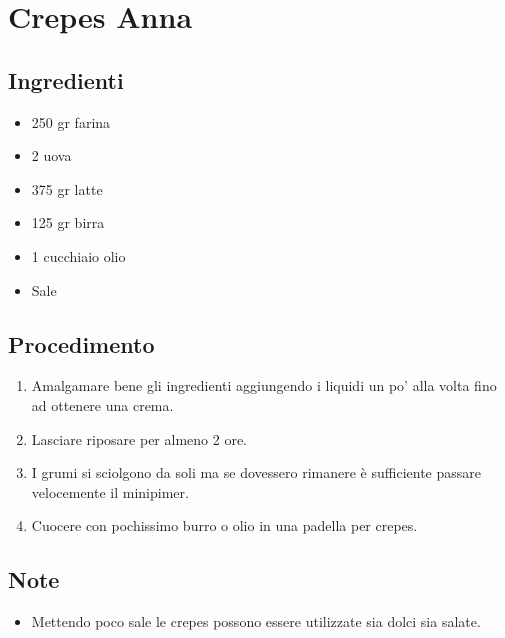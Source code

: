 \section{Crepes Anna}
\subsection{Ingredienti}
\begin{itemize}
\item 250 gr farina  
\item 2 uova  
\item 375 gr latte  
\item 125 gr birra  
\item 1 cucchiaio olio  
\item Sale
\end{itemize}
\subsection{Procedimento}
\begin{enumerate}
\item  Amalgamare bene gli ingredienti aggiungendo i liquidi un po' alla volta fino ad ottenere una crema.  
\item  Lasciare riposare per almeno 2 ore.  
\item  I grumi si sciolgono da soli ma se dovessero rimanere è sufficiente passare velocemente il minipimer.  
\item  Cuocere con pochissimo burro o olio in una padella per crepes.
\end{enumerate}
\subsection{Note}
\begin{itemize}
\item Mettendo poco sale le crepes possono essere utilizzate sia dolci sia salate.
\end{itemize}
